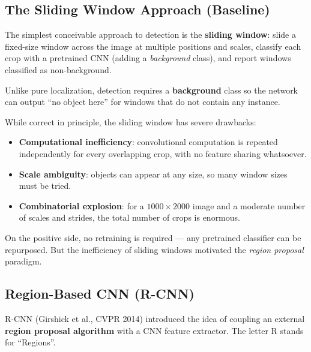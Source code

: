 \documentclass[11pt,a4paper]{article}
\newcommand{\term}[1]{\textcolor{DefGreen}{\textbf{#1}}}
\begin{document}
\subsection{The Sliding Window Approach (Baseline)}
\label{sec:sliding_window_detection}

The simplest conceivable approach to detection is the \term{sliding window}: slide a fixed-size window across the image at multiple positions and scales, classify each crop with a pretrained CNN (adding a \emph{background} class), and report windows classified as non-background.

\begin{notebox}
Unlike pure localization, detection requires a \textbf{background} class so the network can output ``no object here'' for windows that do not contain any instance.
\end{notebox}

While correct in principle, the sliding window has severe drawbacks:
\begin{itemize}
  \item \textbf{Computational inefficiency}: convolutional computation is repeated independently for every overlapping crop, with no feature sharing whatsoever.
  \item \textbf{Scale ambiguity}: objects can appear at any size, so many window sizes must be tried.
  \item \textbf{Combinatorial explosion}: for a $1000 \times 2000$ image and a moderate number of scales and strides, the total number of crops is enormous.
\end{itemize}
On the positive side, no retraining is required — any pretrained classifier can be repurposed. But the inefficiency of sliding windows motivated the \emph{region proposal} paradigm.

\subsection{Region-Based CNN (R-CNN)}
\label{sec:rcnn}

R-CNN (Girshick et al., CVPR 2014) introduced the idea of coupling an external \term{region proposal algorithm} with a CNN feature extractor. The letter R stands for ``Regions''.
\end{document}
